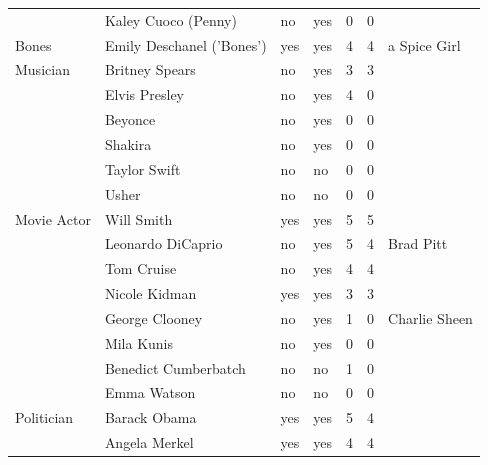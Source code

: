 \documentclass[fleqn,10pt]{SelfArx} %
\begin{document}
\begin{table}[htbp]
\begin{tabular}{lllllll}
		& Kaley Cuoco (Penny)          & no      & yes   & 0               & 0            &                  \\
		Bones           & Emily Deschanel ('Bones')    & yes     & yes   & 4               & 4            & a Spice Girl     \\
		Musician        & Britney Spears               & no      & yes   & 3               & 3            &                  \\
		& Elvis Presley                & no      & yes   & 4               & 0            &                  \\
		& Beyonce                      & no      & yes   & 0               & 0            &                  \\
		& Shakira                      & no      & yes   & 0               & 0            &                  \\
		& Taylor Swift                 & no      & no    & 0               & 0            &                  \\
		& Usher                        & no      & no    & 0               & 0            &                  \\
		Movie Actor     & Will Smith                   & yes     & yes   & 5               & 5            &                  \\
		& Leonardo DiCaprio            & no      & yes   & 5               & 4            & Brad Pitt        \\
		& Tom Cruise                   & no      & yes   & 4               & 4            &                  \\
		& Nicole Kidman                & yes     & yes   & 3               & 3            &                  \\
		& George Clooney               & no      & yes   & 1               & 0            & Charlie Sheen    \\
		& Mila Kunis                   & no      & yes   & 0               & 0            &                  \\
		& Benedict Cumberbatch         & no      & no    & 1               & 0            &                  \\
		& Emma Watson                  & no      & no    & 0               & 0            &                  \\
		Politician      & Barack Obama                 & yes     & yes   & 5               & 4            &                  \\
		& Angela Merkel                & yes     & yes   & 4               & 4            &                  \\

\end{tabular}
\end{table}
\end{document}
